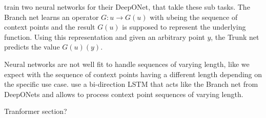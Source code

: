 \citet{Lu_2021} train two neural networks for their DeepONet, that takle these sub tasks. The Branch net learns an operator $G: u\rightarrow G(u)$ with $u$being the sequence of context points and the result $G(u)$ is supposed to represent the underlying function. Using this representation and given an arbitrary point $y$, the Trunk net predicts the value $G(u)(y)$. \cite{Lu_2021}

Neural networks are not well fit to handle sequences of varying length, like we expect with the sequence of context points having a different length depending on the specific use case. \citet{seifner2025zeroshotimputationfoundationinference} use a bi-direction LSTM that acts like the Branch net from DeepONets and allows to process context point sequences of varying length. 

Tranformer section?